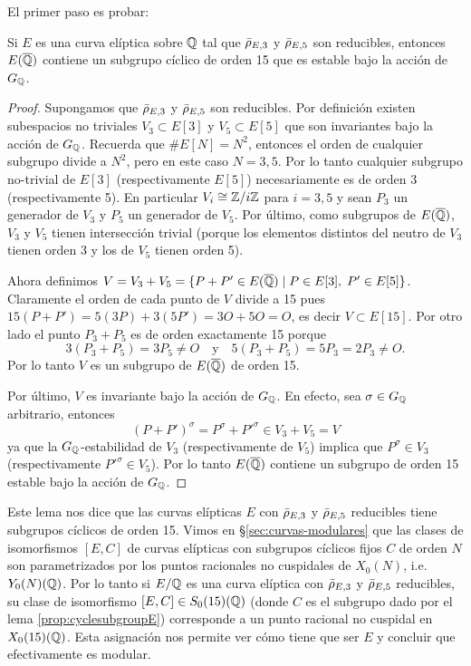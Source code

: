 \documentclass[../../tesis_maestria]{subfiles}
\begin{document}
El primer paso es probar:

\begin{lema}\label{prop:cyclesubgroupE}%
	  Si $E$ es una curva el\'iptica sobre $\mathbb{Q}$ tal que $\bar{\rho}_{E,3}$ y $\bar{\rho}_{E,5}$ son reducibles, entonces $E(\overline{\mathbb{Q}})$ contiene un subgrupo cíclico de orden 15 que es estable bajo la acción de $G_{\mathbb{Q}}$.
\end{lema}

\begin{proof}
  Supongamos que $\bar{\rho}_{E,3}$ y $\bar{\rho}_{E,5}$ son reducibles. Por definici\'on existen subespacios no triviales $V_3\subset E[3]$ y $V_5\subset E[5]$ que son invariantes bajo la acci\'on de $G_{\mathbb{Q}}$. Recuerda que $\# E[N]=N^2$, entonces el orden de cualquier subgrupo divide a $N^2$, pero en este caso $N=3,5$. Por lo tanto cualquier subgrupo no-trivial de $E[3]$ (respectivamente $E[5]$) necesariamente es de orden 3 (respectivamente 5). En particular $V_i\cong \mathbb{Z}/i\mathbb{Z}$ para $i=3,5$ y sean $P_3$ un generador de $V_3$ y $P_5$ un generador de $V_5$. Por \'ultimo, como subgrupos de $E(\overline{\mathbb{Q}})$, $V_3$ y $V_5$ tienen intersecci\'on trivial (porque los elementos distintos del neutro de $V_3$ tienen orden 3 y los de $V_5$ tienen orden 5).
  
  Ahora definimos $V=V_3+V_5=\{P+P'\in E(\overline{\mathbb{Q}}) \mid P\in E[3],\; P'\in E[5]\}$. Claramente el orden de cada punto de $V$ divide a 15 pues $15(P+P')=5(3P)+3(5P')=3O+5O=O$, es decir $V\subset E[15]$. Por otro lado el punto $P_3+P_5$ es de orden exactamente 15 porque
  \[
    3(P_3+P_5)=3P_5\neq O \quad\mathrm{y}\quad 5(P_3+P_5)=5P_3=2P_3\neq O.
  \]
  Por lo tanto $V$ es un subgrupo de $E(\overline{\mathbb{Q}})$ de orden 15.

  Por \'ultimo, $V$ es invariante bajo la acci\'on de $G_{\mathbb{Q}}$. En efecto, sea $\sigma\in G_{\mathbb{Q}}$ arbitrario, entonces
  \[
    (P+P')^{\sigma}=P^{\sigma}+P'^{\sigma}\in V_3+V_5=V
  \]
  ya que la $G_{\mathbb{Q}}$-estabilidad de $V_3$ (respectivamente de $V_5$) implica que $P^{\sigma}\in V_3$ (respectivamente $P'^{\sigma}\in V_5$). Por lo tanto $E(\overline{\mathbb{Q}})$ contiene un subgrupo de orden 15 estable bajo la acci\'on de $G_{\mathbb{Q}}$.
\end{proof}

Este lema nos dice que las curvas elípticas $E$ con $\bar{\rho}_{E,3}$ y $\bar{\rho}_{E,5}$ reducibles tiene subgrupos cíclicos de orden 15. Vimos en \S\ref{sec:curvas-modulares} que las clases de isomorfismos $[E,C]$ de curvas elípticas con subgrupos cíclicos fijos $C$ de orden $N$ son parametrizados por los puntos racionales no cuspidales de $X_0(N)$, i.e. $Y_0(N)(\mathbb{Q})$. Por lo tanto si $E/\mathbb{Q}$ es una curva elíptica con $\bar{\rho}_{E,3}$ y $\bar{\rho}_{E,5}$ reducibles, su clase de isomorfismo $[E,C]\in S_0(15)(\mathbb{Q})$ (donde $C$ es el subgrupo dado por el lema \ref{prop:cyclesubgroupE}) corresponde a un punto racional no cuspidal en $X_0(15)(\mathbb{Q})$. Esta asignación nos permite ver cómo tiene que ser $E$ y concluir que efectivamente es modular.
\end{document}
